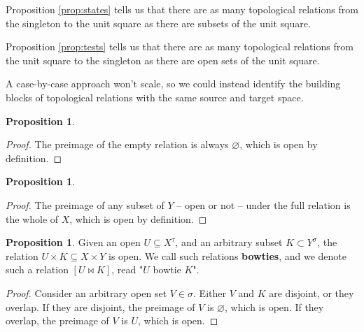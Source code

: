 \documentclass{tufte-handout}
\theoremstyle{definition}
\newtheorem{proposition}[theorem]{Proposition}
\newtheorem{rem}[theorem]{Reminder}
\begin{document}
\newthought{$\bullet \rightarrow \blacksquare$:} Proposition \ref{prop:states} tells us that there are as many topological relations from the singleton to the unit square as there are subsets of the unit square.

\newthought{$\blacksquare \rightarrow \bullet$:} Proposition \ref{prop:tests} tells us that there are as many topological relations from the unit square to the singleton as there are open sets of the unit square.

 A case-by-case approach won't scale, so we could instead identify the building blocks of topological relations with the same source and target space.


\begin{proposition}
\label{prop:emptyrel}
\begin{proof}
The preimage of the empty relation is always $\varnothing$, which is open by definition.
\end{proof}
\end{proposition}

\begin{proposition}
\label{prop:fullrel}
\begin{proof}
The preimage of any subset of $Y$ -- open or not -- under the full relation is the whole of $X$, which is open by definition.
\end{proof}
\end{proposition}

\begin{proposition}\label{prop:bowtie}
Given an open $U \subseteq X^\tau$, and an arbitrary subset $K \subset Y^\sigma$, the relation $U \times K \subseteq X \times Y$ is open. We call such relations \textbf{bowties}, and we denote such a relation $[U\bowtie K]$, read "$U$ bowtie $K$".
\begin{proof}
Consider an arbitrary open set $V \in \sigma$. Either $V$ and $K$ are disjoint, or they overlap. If they are disjoint, the preimage of $V$ is $\varnothing$, which is open. If they overlap, the preimage of $V$ is $U$, which is open.
\end{proof}
\end{proposition}
\end{document}
